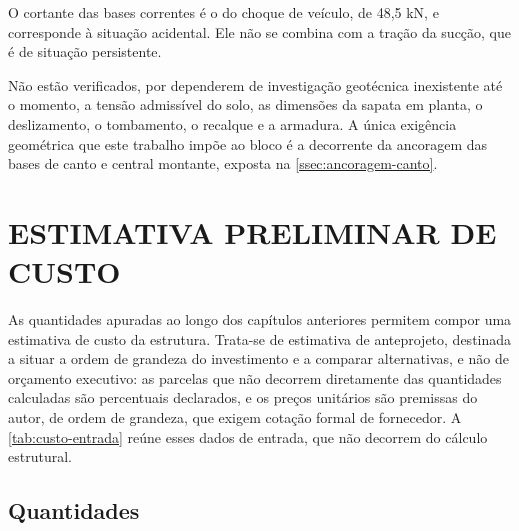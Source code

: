 O cortante das bases correntes é o do choque de veículo, de 48,5 kN, e
corresponde à situação acidental. Ele não se combina com a tração da sucção,
que é de situação persistente.

Não estão verificados, por dependerem de investigação geotécnica inexistente até
o momento, a tensão admissível do solo, as dimensões da sapata em planta, o
deslizamento, o tombamento, o recalque e a armadura. A única exigência
geométrica que este trabalho impõe ao bloco é a decorrente da ancoragem das bases
de canto e central montante, exposta na \autoref{ssec:ancoragem-canto}.

\section{ESTIMATIVA PRELIMINAR DE CUSTO}\label{sec:estimativa-custo}

As quantidades apuradas ao longo dos capítulos anteriores permitem compor uma
estimativa de custo da estrutura. Trata-se de estimativa de anteprojeto,
destinada a situar a ordem de grandeza do investimento e a comparar
alternativas, e não de orçamento executivo: as parcelas que não decorrem
diretamente das quantidades calculadas são percentuais declarados, e os preços
unitários são premissas do autor, de ordem de grandeza, que exigem cotação
formal de fornecedor. A
\autoref{tab:custo-entrada} reúne esses dados de entrada, que não decorrem do
cálculo estrutural.


\subsection{Quantidades}\label{ssec:custo-quantidades}

